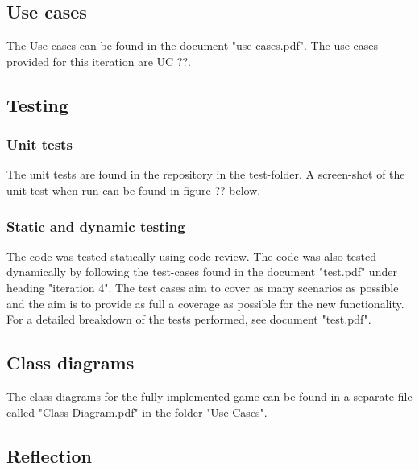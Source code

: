 \documentclass[12pt, letterpaper]{article}
\begin{document}
\subsection{Use cases}
The Use-cases can be found in the document "use-cases.pdf". The use-cases provided for this iteration are UC ??.
\subsection{Testing}
\subsubsection{Unit tests}
The unit tests are found in the repository in the test-folder. A screen-shot of the unit-test when run can be found in figure ?? below.
\subsubsection{Static and dynamic testing}
The code was tested statically using code review. The code was also tested dynamically by following the test-cases found in the document "test.pdf" under heading "iteration 4". The test cases aim to cover as many scenarios as possible and the aim is to provide as full a coverage as possible for the new functionality. For a detailed breakdown of the tests performed, see document "test.pdf". 
\subsection{Class diagrams}
The class diagrams for the fully implemented game can be found in a separate file called "Class Diagram.pdf" in the folder "Use Cases".
\subsection{Reflection}
\end{document}
